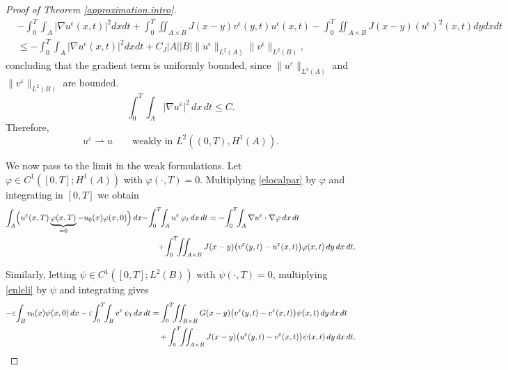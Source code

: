 \documentclass[10pt,a4paper]{amsart}
\begin{document}
\begin{proof}[Proof of Theorem \ref{approximation.intro}]
\begin{align*}
    &-\int_{0}^{T}\int_A|\nabla u^\epsilon(x,t)|^2dxdt + \int_{0}^{T}\iint_{A\times B} J(x-y)v^\epsilon(y,t)u^\epsilon(x,t)-\int_{0}^{T}\iint_{A\times B} J(x-y)(u^\epsilon)^2(x,t)dydxdt\\
&\leq -\int_{0}^{T}\int_A|\nabla u^\epsilon(x,t)|^2dxdt +C_J|A||B|\|u^\epsilon\|_{L^2(A)}\|v^\epsilon\|_{L^2(B)},
\end{align*}
concluding that the gradient term is uniformly bounded, since $\|u^\varepsilon\|_{L^2(A)}$ and $\|v^\varepsilon\|_{L^2(B)}$ are bounded. 
$$\int_0^T\!\!\int_A |\nabla u^\varepsilon|^2\,dx\,dt\le C.$$
Therefore,
\begin{equation}\label{eH1weakconvp-e}
u^\varepsilon \rightharpoonup u
\qquad\text{weakly in } L^2 ((0,T),H^1(A)).
\end{equation}


We now pass to the limit in the weak formulations.  
Let $\varphi\in C^1([0,T];H^1(A))$ with $\varphi(\cdot,T)=0$.  
Multiplying \eqref{elocalpar} by $\varphi$ and integrating in $[0,T]$ we obtain
\begin{align}\label{elocalp-e}
\int_A\!\Big( u^\varepsilon(x,T)\underbrace{\varphi(x,T)}_{=0}
      -u_0(x)\varphi(x,0)\Big)\,dx
-&\!\int_0^T\!\!\int_A u^\varepsilon\,\varphi_t\,dx\,dt
=
-\!\int_0^T\!\!\int_A \nabla u^\varepsilon\cdot\nabla\varphi\,dx\,dt
\notag\\
&\quad
+\!\int_0^T\!\!\iint_{A\times B}
  J(x-y)\big( v^\varepsilon(y,t)-u^\varepsilon(x,t) \big)
  \varphi(x,t)\,dy\,dx\,dt.
\end{align}

Similarly, letting $\psi\in C^1([0,T];L^2(B))$ with $\psi(\cdot,T)=0$,
multiplying \eqref{enleli} by $\psi$ and integrating gives
\begin{align}\label{enlp-e}
-\varepsilon\!\int_B v_0(x)\psi(x,0)\,dx
-\varepsilon\!\int_0^T\!\!\int_B v^\varepsilon\,\psi_t\,dx\,dt
&=
\int_0^T\!\!\iint_{B\times B}
  G(x-y)\big( v^\varepsilon(y,t)-v^\varepsilon(x,t) \big)
  \psi(x,t)\,dy\,dx\,dt
\notag\\
&\quad
+\int_0^T\!\!\iint_{A\times B}
  J(x-y)\big( u^\varepsilon(y,t)-v^\varepsilon(x,t) \big)
  \psi(x,t)\,dy\,dx\,dt.
\end{align}


\end{proof}
\end{document}
